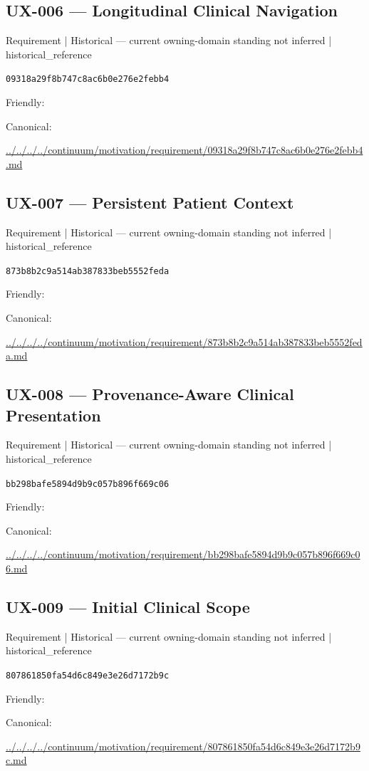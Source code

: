 \documentclass[10pt,a4paper]{article}
\begin{document}
\subsection*{UX-006 — Longitudinal Clinical Navigation}
{\small Requirement | Historical — current owning-domain standing not inferred | historical\_reference}\par
\texttt{09318a29f8b747c8ac6b0e276e2febb4}\par
Friendly: \par
Canonical: \par
{\footnotesize\url{../../../../continuum/motivation/requirement/09318a29f8b747c8ac6b0e276e2febb4.md}}\par
\subsection*{UX-007 — Persistent Patient Context}
{\small Requirement | Historical — current owning-domain standing not inferred | historical\_reference}\par
\texttt{873b8b2c9a514ab387833beb5552feda}\par
Friendly: \par
Canonical: \par
{\footnotesize\url{../../../../continuum/motivation/requirement/873b8b2c9a514ab387833beb5552feda.md}}\par
\subsection*{UX-008 — Provenance-Aware Clinical Presentation}
{\small Requirement | Historical — current owning-domain standing not inferred | historical\_reference}\par
\texttt{bb298bafe5894d9b9c057b896f669c06}\par
Friendly: \par
Canonical: \par
{\footnotesize\url{../../../../continuum/motivation/requirement/bb298bafe5894d9b9c057b896f669c06.md}}\par
\subsection*{UX-009 — Initial Clinical Scope}
{\small Requirement | Historical — current owning-domain standing not inferred | historical\_reference}\par
\texttt{807861850fa54d6c849e3e26d7172b9c}\par
Friendly: \par
Canonical: \par
{\footnotesize\url{../../../../continuum/motivation/requirement/807861850fa54d6c849e3e26d7172b9c.md}}\par
\end{document}
